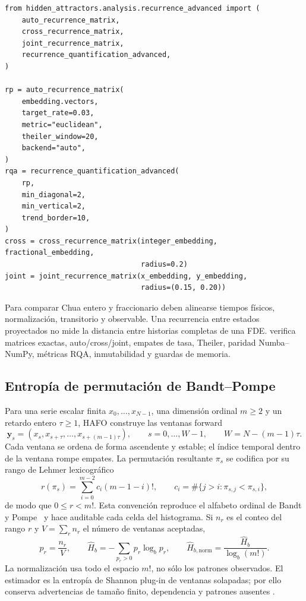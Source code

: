\begin{verbatim}
from hidden_attractors.analysis.recurrence_advanced import (
    auto_recurrence_matrix,
    cross_recurrence_matrix,
    joint_recurrence_matrix,
    recurrence_quantification_advanced,
)

rp = auto_recurrence_matrix(
    embedding.vectors,
    target_rate=0.03,
    metric="euclidean",
    theiler_window=20,
    backend="auto",
)
rqa = recurrence_quantification_advanced(
    rp,
    min_diagonal=2,
    min_vertical=2,
    trend_border=10,
)
cross = cross_recurrence_matrix(integer_embedding, fractional_embedding,
                                radius=0.2)
joint = joint_recurrence_matrix(x_embedding, y_embedding,
                                radius=(0.15, 0.20))
\end{verbatim}
Para comparar Chua entero y fraccionario deben alinearse tiempos físicos,
normalización, transitorio y observable. Una recurrencia entre estados
proyectados no mide la distancia entre historias completas de una FDE.
 verifica matrices exactas,
auto/cross/joint, empates de tasa, Theiler, paridad Numba--NumPy, métricas RQA,
inmutabilidad y guardas de memoria.

\subsection{Entropía de permutación de Bandt--Pompe}
\label{sec:permutation-entropy}

Para una serie escalar finita $x_0,\ldots,x_{N-1}$, una dimensión ordinal
$m\geq2$ y un retardo entero $\tau\geq1$, HAFO construye las ventanas forward
\[
 \mathbf y_s=(x_s,x_{s+\tau},\ldots,x_{s+(m-1)\tau}),
 \qquad s=0,\ldots,W-1,
 \qquad W=N-(m-1)\tau.
\]
Cada ventana se ordena de forma ascendente y estable; el índice temporal dentro
de la ventana rompe empates. La permutación resultante $\pi_s$ se codifica por
su rango de Lehmer lexicográfico
\[
 r(\pi_s)=\sum_{i=0}^{m-2}c_i(m-1-i)!,
 \qquad
 c_i=\#\{j>i:\pi_{s,j}<\pi_{s,i}\},
\]
de modo que $0\leq r<m!$. Esta convención reproduce el alfabeto ordinal de
Bandt y Pompe~\cite{BandtPompe2002} y hace auditable cada celda del histograma.
Si $n_r$ es el conteo del rango $r$ y $V=\sum_r n_r$ el número de ventanas
aceptadas,
\[
 p_r=\frac{n_r}{V},\qquad
 \widehat H_b=-\sum_{p_r>0}p_r\log_b p_r,
 \qquad
 \widehat H_{b,\mathrm{norm}}=
 \frac{\widehat H_b}{\log_b(m!)}.
\]
La normalización usa todo el espacio $m!$, no sólo los patrones observados. El
estimador es la entropía de Shannon plug-in de ventanas solapadas; por ello
conserva advertencias de tamaño finito, dependencia y patrones ausentes
\cite{UnakafovaKeller2013EfficientPermutation,
ReyEtAl2023PermutationAsymptotic}.

